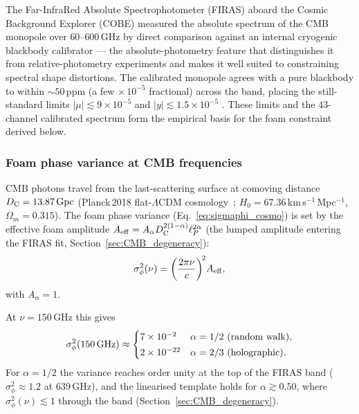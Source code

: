 \documentclass[aps,prd,onecolumn,amsmath,amssymb]{revtex4-2}
\begin{document}
The Far-InfraRed Absolute Spectrophotometer (FIRAS) aboard the Cosmic
Background Explorer (COBE) measured the absolute spectrum of the CMB
monopole over $60$--$600$\,GHz by direct comparison against an internal
cryogenic blackbody calibrator --- the absolute-photometry feature that
distinguishes it from relative-photometry experiments and makes it
well suited to constraining spectral shape distortions.  The
calibrated monopole agrees with a pure blackbody to within
$\sim 50$\,ppm (a few$\,\times10^{-5}$ fractional) across the band,
placing the still-standard limits $|\mu|\lesssim 9\times10^{-5}$ and
$|y|\lesssim 1.5\times10^{-5}$ \cite{Fixsen1996}.  These limits and the
$43$-channel calibrated spectrum form the empirical basis for the foam
constraint derived below.

\subsubsection{Foam phase variance at CMB frequencies}
\label{sec:CMB_phasevar}

CMB photons travel from the last-scattering surface at comoving distance
$D_{\rm C}= 13.87\,{\rm Gpc}$ (Planck\,2018 flat-$\Lambda$CDM cosmology~\cite{Aghanim2020};
$H_0 = 67.36$\,km\,s$^{-1}$\,Mpc$^{-1}$, $\Omega_m=0.315$).  The foam phase
variance (Eq.~\eqref{eq:sigmaphi_cosmo}) is set by the effective foam
amplitude $A_{\rm eff}=A_\alpha D_{\rm C}^{2(1-\alpha)}\ell_P^{2\alpha}$
(the lumped amplitude entering the FIRAS fit,
Section~\ref{sec:CMB_degeneracy}):
\begin{equation}
  \sigma_\phi^2(\nu)
    = \left(\frac{2\pi\nu}{c}\right)^{\!2}\! A_{\rm eff},
  \label{eq:sigma_phi_CMB}
\end{equation}
with $A_\alpha=1$.

At $\nu=150$\,GHz this gives
\begin{equation}
  \sigma_\phi^2(150\,{\rm GHz})\approx
  \begin{cases}
    7\times10^{-2}  & \alpha=1/2\ \text{(random walk)},\\[2pt]
    2\times10^{-22}      & \alpha=2/3\ \text{(holographic)}.
  \end{cases}
  \label{eq:sigma_phi_CMB_values}
\end{equation}
For $\alpha=1/2$ the variance reaches order unity at the top of the
FIRAS band ($\sigma_\phi^2\approx1.2$ at $639$\,GHz), and the linearised
template holds for $\alpha\gtrsim0.50$, where $\sigma_\phi^2(\nu)\lesssim1$
through the band (Section~\ref{sec:CMB_degeneracy}).
\end{document}
